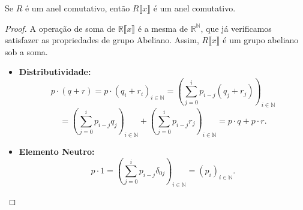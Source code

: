 \begin{lemma}
    Se $R$ é um anel comutativo, então $R\llbracket x \rrbracket$ é um anel comutativo.
\end{lemma}

\begin{proof}
    A operação de soma de $\mathbb R\llbracket x \rrbracket$ é a mesma de $\mathbb R^{\mathbb N}$, que já verificamos satisfazer as propriedades de grupo Abeliano. Assim, $R\llbracket x \rrbracket$ é um grupo abeliano sob a soma.
    \begin{itemize}
        \item \textbf{Distributividade:} $$p\cdot (q+r)=p\cdot(q_i+r_i)_{i \in \mathbb N}=\left(\sum_{j=0}^i p_{i-j}(q_j+r_j)\right)_{i \in \mathbb N}$$$$=\left(\sum_{j=0}^i p_{i-j}q_j\right)_{i \in \mathbb N}+\left(\sum_{j=0}^i p_{i-j}r_j\right)_{i \in \mathbb N}=p\cdot q+p\cdot r.$$
        \item \textbf{Elemento Neutro:} $$p\cdot 1=\left(\sum_{j=0}^i p_{i-j}\delta_{0j}\right)_{i\in \mathbb N}=(p_i)_{i \in \mathbb N}.$$
    \end{itemize}
\end{proof}